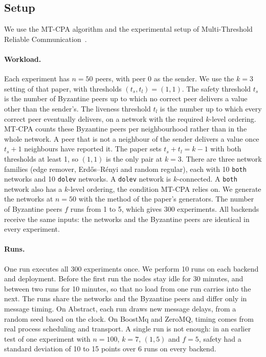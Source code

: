 \documentclass[11pt,a4paper]{article}
\newcommand{\code}[1]{\texttt{#1}}
\begin{document}
\subsection{Setup}

We use the MT-CPA algorithm and the experimental setup of Multi-Threshold Reliable
Communication~\cite{opodis-mtrc}.

\paragraph{Workload.} Each experiment has $n = 50$ peers, with peer 0 as the sender. We use the
$k = 3$ setting of that paper, with thresholds $(t_s, t_l) = (1, 1)$. The safety threshold $t_s$ is
the number of Byzantine peers up to which no correct peer delivers a value other than the sender's.
The liveness threshold $t_l$ is the number up to which every correct peer eventually delivers, on a
network with the required $k$-level ordering. MT-CPA counts these Byzantine peers per neighbourhood
rather than in the whole network. A peer that is not a neighbour of the sender delivers a value once
$t_s + 1$ neighbours have reported it. The paper sets $t_s + t_l = k - 1$ with both thresholds at
least 1, so $(1, 1)$ is the only pair at $k = 3$. There are three network families (edge remover,
Erd\H{o}s--R\'enyi and random regular), each with 10 \code{both} networks and 10 \code{dolev}
networks. A \code{dolev} network is $k$-connected. A \code{both} network also has a $k$-level
ordering, the condition MT-CPA relies on. We generate the networks at $n = 50$ with the method of
the paper's generators. The number of Byzantine peers $f$ runs from 1 to 5, which gives 300
experiments. All backends receive the same inputs: the networks and the Byzantine peers are
identical in every experiment.

\paragraph{Runs.} One run executes all 300 experiments once. We perform 10 runs on each backend and
deployment. Before the first run the nodes stay idle for 30 minutes, and between two runs for
10 minutes, so that no load from one run carries into the next. The runs share the networks and the
Byzantine peers and differ only in message timing. On Abstract, each run draws new message delays,
from a random seed based on the clock. On BoostMq and ZeroMQ, timing comes from real process
scheduling and transport. A single run is not enough: in an earlier test of one experiment with
$n = 100$, $k = 7$, $(1, 5)$ and $f = 5$, safety had a standard deviation of 10 to 15 points over
6 runs on every backend.
\end{document}
